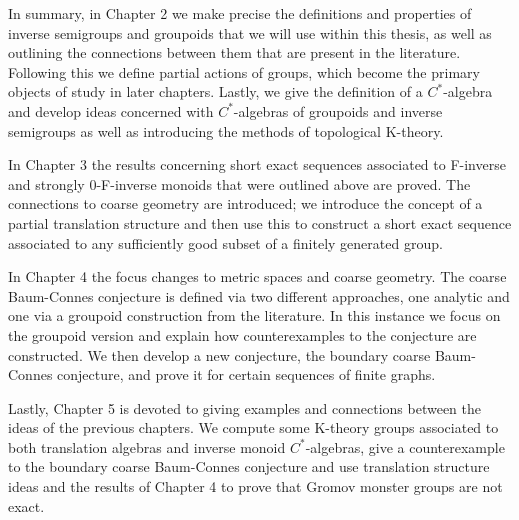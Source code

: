 In summary, in Chapter 2 we make precise the definitions and properties of inverse semigroups and groupoids that we will use within this thesis, as well as outlining the connections between them that are present in the literature. Following this we define partial actions of groups, which become the primary objects of study in later chapters. Lastly, we give the definition of a $C^{*}$-algebra and develop ideas concerned with $C^{*}$-algebras of groupoids and inverse semigroups as well as introducing the methods of topological K-theory.

In Chapter 3 the results concerning short exact sequences associated to F-inverse and strongly 0-F-inverse monoids that were outlined above are proved. The connections to coarse geometry are introduced; we introduce the concept of a partial translation structure and then use this to construct a short exact sequence associated to any sufficiently good subset of a finitely generated group. 

In Chapter 4 the focus changes to metric spaces and coarse geometry. The coarse Baum-Connes conjecture is defined via two different approaches, one analytic and one via a groupoid construction from the literature. In this instance we focus on the groupoid version and explain how counterexamples to the conjecture are constructed. We then develop a new conjecture, the boundary coarse Baum-Connes conjecture, and prove it for certain sequences of finite graphs.

Lastly, Chapter 5 is devoted to giving examples and connections between the ideas of the previous chapters. We compute some K-theory groups associated to both translation algebras and inverse monoid $C^{*}$-algebras, give a counterexample to the boundary coarse Baum-Connes conjecture and use translation structure ideas and the results of Chapter 4 to prove that Gromov monster groups are not exact.
